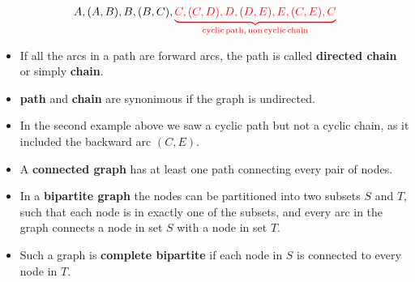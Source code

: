 \documentclass{beamer}
\begin{document}
\begin{frame}
  \begin{center}
\end{center}
\[A,(A,B),B,(B,C),\color{red}{\underbrace{C,(C,D),D,(D,E),E,(C,E),C}_{\mathrm{cyclic \, path, \,non \, cyclic  \, chain}}}\]

\end{frame}

\begin{frame}
  \begin{itemize}
    \item If all the arcs in a path are forward arcs, the path is called {\bf directed chain} or simply {\bf chain}.
    \item {\bf path} and {\bf chain} are synonimous if the graph is undirected.
    \item In the second example above we saw a cyclic path but not a cyclic chain, as it included the backward arc $(C,E)$. 
    \item A {\bf connected graph} has at least one path connecting every pair of nodes.
    \item In a {\bf bipartite graph} the nodes can be partitioned into two subsets $S$ and $T$, such that each node is in exactly one of the subsets, and every arc in the graph connects a node in set $S$ with a node in set $T$.
    \item Such a graph is {\bf complete bipartite} if each node in $S$ is connected to every node in $T$.
  \end{itemize}
\end{frame}
\end{document}
